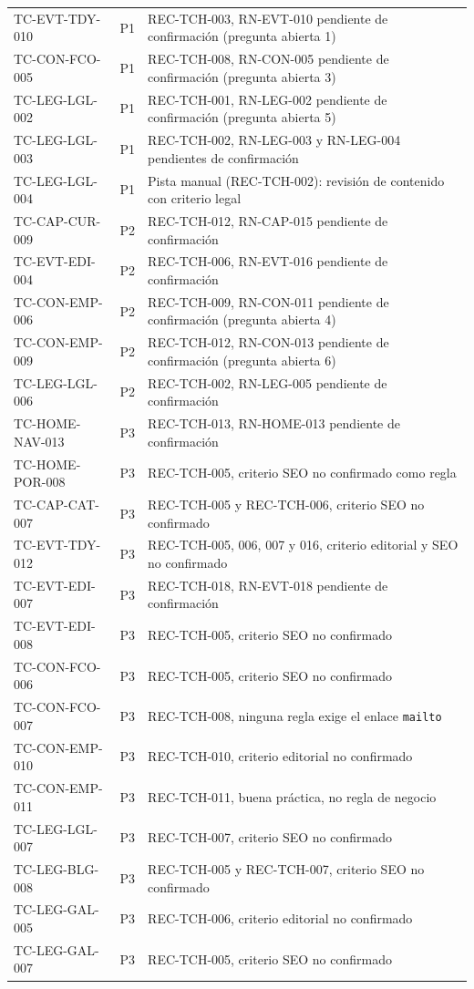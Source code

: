 \documentclass[11pt,a4paper]{article}
\newcommand{\code}[1]{\texttt{#1}}
\begin{document}
{\begin{longtable}{@{}p{} c >{\raggedright\arraybackslash}p{}@{}}
TC-EVT-TDY-010 & P1 & REC-TCH-003, RN-EVT-010 pendiente de confirmación (pregunta abierta 1) \\
TC-CON-FCO-005 & P1 & REC-TCH-008, RN-CON-005 pendiente de confirmación (pregunta abierta 3) \\
TC-LEG-LGL-002 & P1 & REC-TCH-001, RN-LEG-002 pendiente de confirmación (pregunta abierta 5) \\
TC-LEG-LGL-003 & P1 & REC-TCH-002, RN-LEG-003 y RN-LEG-004 pendientes de confirmación \\
TC-LEG-LGL-004 & P1 & Pista manual (REC-TCH-002): revisión de contenido con criterio legal \\
TC-CAP-CUR-009 & P2 & REC-TCH-012, RN-CAP-015 pendiente de confirmación \\
TC-EVT-EDI-004 & P2 & REC-TCH-006, RN-EVT-016 pendiente de confirmación \\
TC-CON-EMP-006 & P2 & REC-TCH-009, RN-CON-011 pendiente de confirmación (pregunta abierta 4) \\
TC-CON-EMP-009 & P2 & REC-TCH-012, RN-CON-013 pendiente de confirmación (pregunta abierta 6) \\
TC-LEG-LGL-006 & P2 & REC-TCH-002, RN-LEG-005 pendiente de confirmación \\
TC-HOME-NAV-013 & P3 & REC-TCH-013, RN-HOME-013 pendiente de confirmación \\
TC-HOME-POR-008 & P3 & REC-TCH-005, criterio SEO no confirmado como regla \\
TC-CAP-CAT-007 & P3 & REC-TCH-005 y REC-TCH-006, criterio SEO no confirmado \\
TC-EVT-TDY-012 & P3 & REC-TCH-005, 006, 007 y 016, criterio editorial y SEO no confirmado \\
TC-EVT-EDI-007 & P3 & REC-TCH-018, RN-EVT-018 pendiente de confirmación \\
TC-EVT-EDI-008 & P3 & REC-TCH-005, criterio SEO no confirmado \\
TC-CON-FCO-006 & P3 & REC-TCH-005, criterio SEO no confirmado \\
TC-CON-FCO-007 & P3 & REC-TCH-008, ninguna regla exige el enlace \code{mailto} \\
TC-CON-EMP-010 & P3 & REC-TCH-010, criterio editorial no confirmado \\
TC-CON-EMP-011 & P3 & REC-TCH-011, buena práctica, no regla de negocio \\
TC-LEG-LGL-007 & P3 & REC-TCH-007, criterio SEO no confirmado \\
TC-LEG-BLG-008 & P3 & REC-TCH-005 y REC-TCH-007, criterio SEO no confirmado \\
TC-LEG-GAL-005 & P3 & REC-TCH-006, criterio editorial no confirmado \\
TC-LEG-GAL-007 & P3 & REC-TCH-005, criterio SEO no confirmado \\
\end{longtable}}
\end{document}

